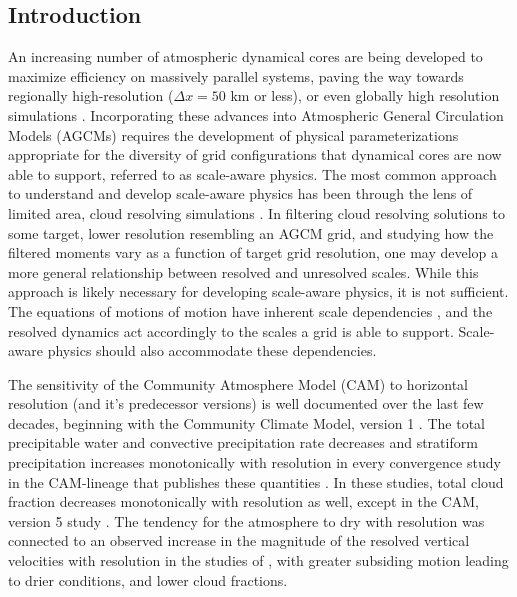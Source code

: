 \subsection{Introduction}

An increasing number of atmospheric dynamical cores are being developed to maximize efficiency on massively parallel systems, paving the way towards regionally high-resolution ($\Delta x = 50$ km or less), or even globally high resolution simulations \citep{MPASatm,Z2014QJRMS,HETAL2016JCLIM,DCMIP16,LetAl2018JAMES}. Incorporating these advances into Atmospheric General Circulation Models (AGCMs) requires the development of physical parameterizations appropriate for the diversity of grid configurations that dynamical cores are now able to support, referred to as scale-aware physics. The most common approach to understand and develop scale-aware physics has been through the lens of limited area, cloud resolving simulations \citep{PC2008JAS,AW2013JAS,SZ2018JCLIM}. In filtering cloud resolving solutions to some target, lower resolution resembling an AGCM grid, and studying how the filtered moments vary as a function of target grid resolution, one may develop a more general relationship between resolved and unresolved scales. While this approach is likely necessary for developing scale-aware physics, it is not sufficient. The equations of motions of motion have inherent scale dependencies \citep{O1981JAS,WETAL1997MWR,PG2006JAS,J2017JAMES}, and the resolved dynamics act accordingly to the scales a grid is able to support. Scale-aware physics should also accommodate these dependencies.

The sensitivity of the Community Atmosphere Model (CAM) to horizontal resolution (and it's predecessor versions) is well documented over the last few decades, beginning with the Community Climate Model, version 1 \citep{KW1991JGR}. The total precipitable water and convective precipitation rate decreases and stratiform precipitation increases monotonically with resolution in every convergence study in the CAM-lineage that publishes these quantities \citep{KW1991JGR,WETAL1995CD,W2008TELLUS,RETAL2013JCLIM,ZetAl2014JCb,HR2017JCLIM}. In these studies, total cloud fraction decreases monotonically with resolution as well, except in the CAM, version 5 study \citep[CAM5;][]{ZetAl2014JCb}. The tendency for the atmosphere to dry with resolution was connected to an observed increase in the magnitude of the resolved vertical velocities with resolution in the studies of \citep{KW1991JGR,WETAL1995CD}, with greater subsiding motion leading to drier conditions, and lower cloud fractions.

